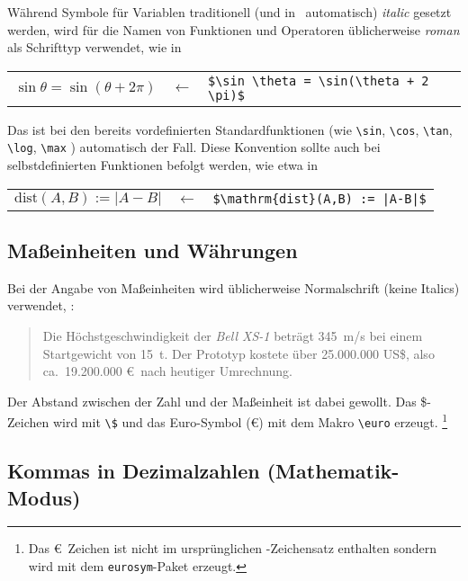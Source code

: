 Während Symbole für Variablen traditionell (und in \latex\ automatisch)
\emph{italic} gesetzt werden, wird für die Namen von Funktionen und
Operatoren üblicherweise \emph{roman} als Schrifttyp verwendet, wie \zB in
%
\begin{center}
	\begin{tabular}{lcl}
		$\sin \theta = \sin(\theta + 2 \pi)$ &
		$\leftarrow$ & \verb!$\sin \theta = \sin(\theta + 2 \pi)$! \\
	\end{tabular}
\end{center}
%
Das ist bei den bereits vordefinierten Standardfunktionen (wie \verb!\sin!,
\verb!\cos!, \verb!\tan!, \verb!\log!, \verb!\max! \uva) automatisch der Fall.
Diese Konvention sollte auch bei selbstdefinierten Funktionen befolgt werden,
wie etwa in
%
\begin{center}
	\begin{tabular}{lcl}
	$\mathrm{dist}(A,B) := |A-B|$ & $\leftarrow$ & 
	\verb!$\mathrm{dist}(A,B) := |A-B|$! \\
	\end{tabular}
\end{center}


\subsection{Maßeinheiten und Währungen}

Bei der Angabe von Maßeinheiten wird üblicherweise Normalschrift (keine
Italics) verwendet, \zB:
%
\begin{quote}
	Die Höchstgeschwindigkeit der \textit{Bell XS-1} beträgt 345~m/s bei
	einem Startgewicht von 15~t. Der Prototyp kostete über 25.000.000 US\$,
	also ca.\ 19.200.000 \euro\ nach heutiger Umrechnung.
\end{quote}
%
Der Abstand zwischen der Zahl und der Maßeinheit ist dabei gewollt. Das
\$-Zeichen wird mit \verb!\$! und das Euro-Symbol (\euro) mit dem Makro
\verb!\euro! erzeugt.%
\footnote{Das \euro\ Zeichen ist nicht im ursprünglichen \latex-Zeichensatz
enthalten sondern wird mit dem \texttt{eurosym}-Paket erzeugt.}


\subsection{Kommas in Dezimalzahlen (Mathematik-Modus)}

